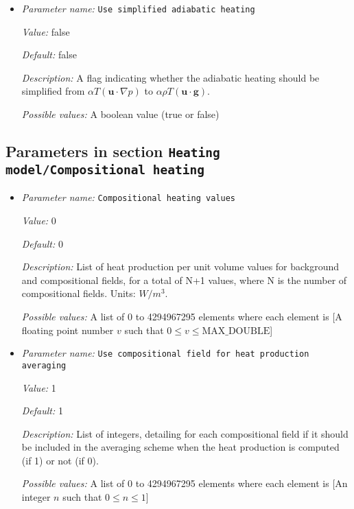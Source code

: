 \begin{itemize}
\item {\it Parameter name:} {\tt Use simplified adiabatic heating}
\label{parameters:Heating model/Adiabatic heating of melt/Use simplified adiabatic heating}


{\it Value:} false


{\it Default:} false


{\it Description:} A flag indicating whether the adiabatic heating should be simplified from $\alpha T (\mathbf u \cdot \nabla p)$ to $ \alpha \rho T (\mathbf u \cdot \mathbf g) $.


{\it Possible values:} A boolean value (true or false)
\end{itemize}

\subsection{Parameters in section \tt Heating model/Compositional heating}
\label{parameters:Heating_20model/Compositional_20heating}

\begin{itemize}
\item {\it Parameter name:} {\tt Compositional heating values}
\label{parameters:Heating model/Compositional heating/Compositional heating values}


{\it Value:} 0


{\it Default:} 0


{\it Description:} List of heat production per unit volume values for background and compositional fields, for a total of N+1 values, where N is the number of compositional fields. Units: $W/m^3$.


{\it Possible values:} A list of 0 to 4294967295 elements where each element is [A floating point number $v$ such that $0 \leq v \leq \text{MAX\_DOUBLE}$]
\item {\it Parameter name:} {\tt Use compositional field for heat production averaging}
\label{parameters:Heating model/Compositional heating/Use compositional field for heat production averaging}


{\it Value:} 1


{\it Default:} 1


{\it Description:} List of integers, detailing for each compositional field if it should be included in the averaging scheme when the heat production is computed (if 1) or not (if 0).


{\it Possible values:} A list of 0 to 4294967295 elements where each element is [An integer $n$ such that $0\leq n \leq 1$]
\end{itemize}

